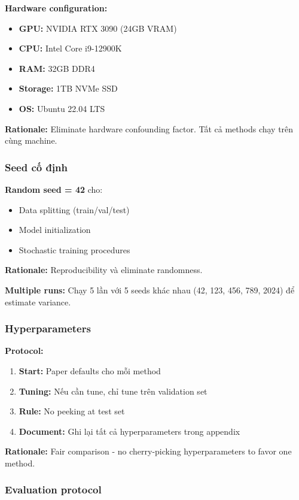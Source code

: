 \textbf{Hardware configuration:}
\begin{itemize}
    \item \textbf{GPU:} NVIDIA RTX 3090 (24GB VRAM)
    \item \textbf{CPU:} Intel Core i9-12900K
    \item \textbf{RAM:} 32GB DDR4
    \item \textbf{Storage:} 1TB NVMe SSD
    \item \textbf{OS:} Ubuntu 22.04 LTS
\end{itemize}

\textbf{Rationale:} Eliminate hardware confounding factor. Tất cả methods chạy trên cùng machine.

\subsubsection{Seed cố định}

\textbf{Random seed = 42} cho:
\begin{itemize}
    \item Data splitting (train/val/test)
    \item Model initialization
    \item Stochastic training procedures
\end{itemize}

\textbf{Rationale:} Reproducibility và eliminate randomness.

\textbf{Multiple runs:} Chạy 5 lần với 5 seeds khác nhau (42, 123, 456, 789, 2024) để estimate variance.

\subsubsection{Hyperparameters}

\textbf{Protocol:}
\begin{enumerate}
    \item \textbf{Start:} Paper defaults cho mỗi method
    \item \textbf{Tuning:} Nếu cần tune, chỉ tune trên validation set
    \item \textbf{Rule:} No peeking at test set
    \item \textbf{Document:} Ghi lại tất cả hyperparameters trong appendix
\end{enumerate}

\textbf{Rationale:} Fair comparison - no cherry-picking hyperparameters to favor one method.

\subsubsection{Evaluation protocol}

